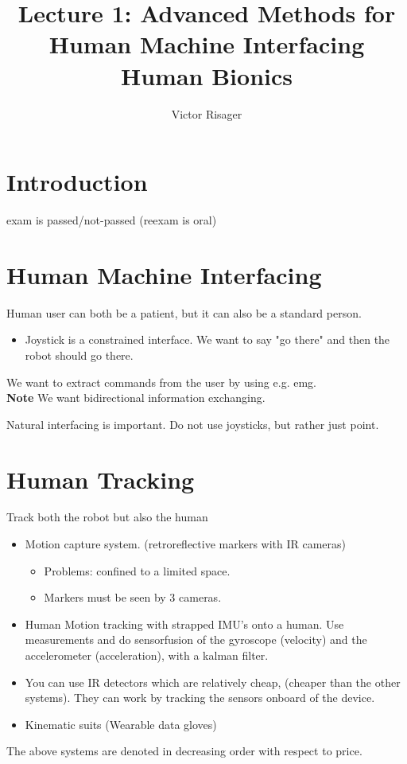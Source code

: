 \documentclass[a4paper]{article}
\title{Lecture 1: Advanced Methods for Human Machine Interfacing  \\
	\large Human Bionics}
\author{Victor Risager}
\begin{document}
\maketitle

\section{Introduction}
exam is passed/not-passed (reexam is oral)

\section{Human Machine Interfacing}
Human user can both be a patient, but it can also be a standard person. 
\begin{itemize}
	\item Joystick is a constrained interface. We want to say "go there" and then the robot should go there.
\end{itemize}

We want to extract commands from the user by using e.g. emg. \\
\textbf{Note} We want bidirectional information exchanging. 

Natural interfacing is important. Do not use joysticks, but rather just point.

\section{Human Tracking}
Track both the robot but also the human
\begin{itemize}
	\item Motion capture system. (retroreflective markers with IR cameras)
		\begin{itemize}
			\item Problems: confined to a limited space.
			\item Markers must be seen by 3 cameras.
		\end{itemize}
	\item Human Motion tracking with strapped IMU's onto a human. Use measurements and do sensorfusion of the gyroscope (velocity) and the accelerometer (acceleration), with a kalman filter.
	\item You can use IR detectors which are relatively cheap, (cheaper than the other systems). They can work by tracking the sensors onboard of the device. 
	\item Kinematic suits (Wearable data gloves)
\end{itemize}
The above systems are denoted in decreasing order with respect to price. 
\end{document}
